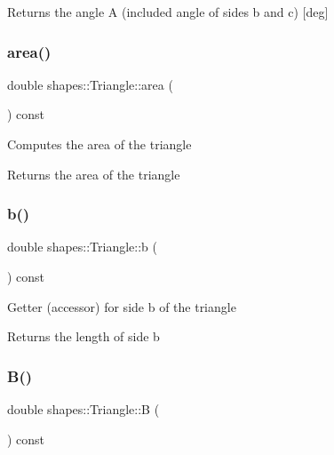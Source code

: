 \begin{DoxyReturn}{Returns}
the angle A (included angle of sides b and c) \mbox{[}deg\mbox{]} 
\end{DoxyReturn}
\mbox{\label{classshapes_1_1Triangle_a4673869657670f09b79dfce87dbc6f09}} 
\subsubsection{\texorpdfstring{area()}{area()}}
{\footnotesize\ttfamily double shapes\+::\+Triangle\+::area (\begin{DoxyParamCaption}{ }\end{DoxyParamCaption}) const}

Computes the area of the triangle

\begin{DoxyReturn}{Returns}
the area of the triangle 
\end{DoxyReturn}
\mbox{\label{classshapes_1_1Triangle_aeca17ef2853d0aa2155814a58afefca9}} 
\subsubsection{\texorpdfstring{b()}{b()}}
{\footnotesize\ttfamily double shapes\+::\+Triangle\+::b (\begin{DoxyParamCaption}{ }\end{DoxyParamCaption}) const\hspace{0.3cm}{\ttfamily [inline]}}

Getter (accessor) for side b of the triangle

\begin{DoxyReturn}{Returns}
the length of side b 
\end{DoxyReturn}
\mbox{\label{classshapes_1_1Triangle_a2457121bdda9751b350debb0bd3c9389}} 
\subsubsection{\texorpdfstring{B()}{B()}}
{\footnotesize\ttfamily double shapes\+::\+Triangle\+::B (\begin{DoxyParamCaption}{ }\end{DoxyParamCaption}) const\hspace{0.3cm}{\ttfamily [inline]}}

